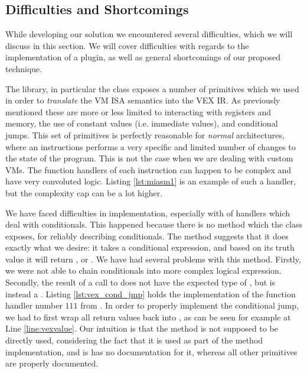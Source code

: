 \subsection{Difficulties and Shortcomings}
\label{sec:shortcomings}

While developing our solution we encountered several difficulties, which we will discuss in this section. We will cover difficulties with regards to the implementation of a plugin, as well as general shortcomings of our proposed technique.

The  library, in particular the  class exposes a number of primitives which we used in order to \emph{translate} the \gls{VM} \gls{ISA} semantics into the VEX \gls{IR}. As previously mentioned these are more or less limited to interacting with registers and memory, the use of constant values (i.e. immediate values), and conditional jumps. This set of primitives is perfectly reasonable for \emph{normal} architectures, where an instructions performs a very specific and limited number of changes to the state of the program. This is not the case when we are dealing with custom \glspl{VM}. The function handlers of each instruction can happen to be complex and have very convoluted logic. Listing \ref{lst:miasm1} is an example of such a handler, but the complexity cap can be a lot higher.

We have faced difficulties in implementation, especially with of handlers which deal with conditionals. This happened because there is no method which the  class exposes, for reliably describing conditionals. The  method suggests that it does exactly what we desire: it takes a conditional expression, and based on its truth value it will return , or . We have had several problems with this method. Firstly, we were not able to chain conditionals into more complex logical expression. Secondly, the result of a call to  does not have the expected type of , but is instead a . Listing \ref{lst:vex_cond_jmp} holds the implementation of the function handler number $111$ from . In order to properly implement the conditional jump, we had to first wrap all  return values back into , as can be seen for example at Line \ref{line:vexvalue}. Our intuition is that the  method is not supposed to be directly used, considering the fact that it is used as part of the  method implementation, and is has no documentation for it, whereas all other primitives are properly documented.

